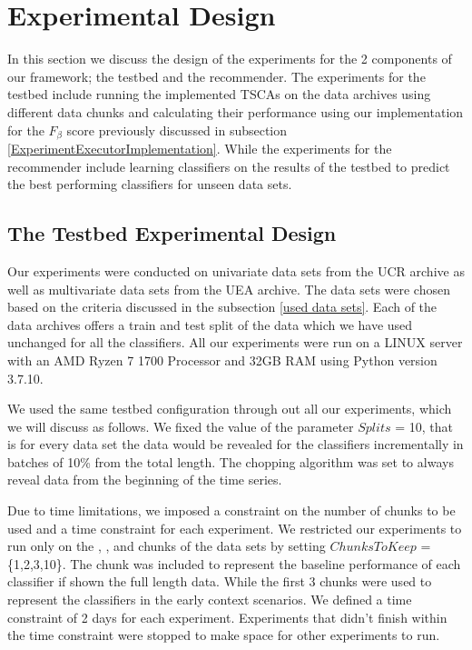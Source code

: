 \section{Experimental Design}
\label{SectionExperiment}
In this section we discuss the design of the experiments for the 2 components of our framework; the testbed and the recommender.
The experiments for the testbed include running the implemented TSCAs on the data archives using different data chunks and calculating their performance using
our implementation for the $F_{\beta}$ score previously discussed in subsection \ref{ExperimentExecutorImplementation}.
While the experiments for the recommender include learning classifiers on the results of the testbed to predict the best performing
classifiers for unseen data sets.

\subsection{The Testbed Experimental Design}
\label{SubsectionTestbedExperiment}
Our experiments were conducted on univariate data sets from the UCR archive as well as multivariate data sets from the UEA archive.
The data sets were chosen based on the criteria discussed in the subsection \ref{used data sets}.
Each of the data archives offers a train and test split of the data which we have used unchanged for all the classifiers.
All our experiments were run on a LINUX server with an AMD Ryzen 7 1700 Processor and 32GB RAM using Python version 3.7.10.

We used the same testbed configuration through out all our experiments, which we will discuss as follows.
We fixed the value of the parameter $Splits$ = 10, that is for every data set the data would be revealed for the classifiers incrementally in batches of 10\% from the total length.
The chopping algorithm was set to always reveal data from the beginning of the time series.

Due to time limitations, we imposed a constraint on the number of chunks to be used and a time constraint for each experiment.
We restricted our experiments to run only on the , ,  and  chunks of the data sets by setting $ChunksToKeep$ = \{1,2,3,10\}.
The  chunk was included to represent the baseline performance of each classifier if shown the full length data.
While the first 3 chunks were used to represent the classifiers in the early context scenarios.
We defined a time constraint of 2 days for each experiment.
Experiments that didn't finish within the time constraint were stopped to make space for other experiments to run.

